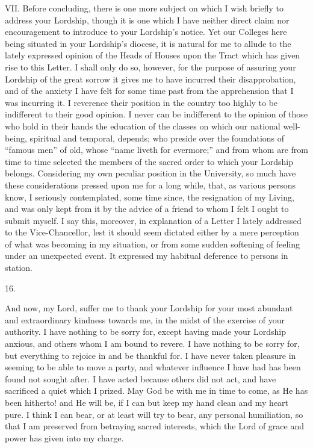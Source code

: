 VII.
Before concluding, there is one more subject on which I wish briefly
to address your Lordship, though it is one which I have neither direct
claim nor encouragement to introduce to your Lordship's notice. Yet
our Colleges here being situated in your Lordship's diocese, it is
natural for me to allude to the lately expressed opinion of the Heads
of Houses upon the Tract which has given rise to this Letter. I shall
only do so, however, for the purpose of assuring your Lordship of the
great sorrow it gives me to have incurred their disapprobation, and of
the anxiety I have felt for some time past from the apprehension that
I was incurring it. I reverence their position in the country too
highly to be indifferent to their good opinion. I never can be
indifferent to the opinion of those who hold in their hands the
education of the classes on which our national well-being, spiritual
and temporal, depends; who preside over the foundations of ``famous men''
of old, whose ``name liveth for evermore;'' and from whom are from time
to time selected the members of the sacred order to which your
Lordship belongs. Considering my own peculiar position in the
University, so much have these considerations pressed upon me for a
long while, that, as various persons know, I seriously contemplated,
some time since, the resignation of my Living, and was only kept from
it by the advice of a friend to whom I felt I ought to submit myself.
I say this, moreover, in explanation of a Letter I lately addressed to
the Vice-Chancellor, lest it should seem dictated either by a
mere perception of what was becoming in my situation, or from some
sudden softening of feeling under an unexpected event. It expressed my
habitual deference to persons in station.

16.

And now, my Lord, suffer me to thank your
Lordship for your most abundant and extraordinary kindness towards me,
in the midst of the exercise of your authority. I have nothing to be
sorry for, except having made your Lordship anxious, and others whom I
am bound to revere. I have nothing to be sorry for, but everything to
rejoice in and be thankful for. I have never taken pleasure in seeming
to be able to move a party, and whatever influence I have had has been
found not sought after. I have acted because others did not act, and
have sacrificed a quiet which I prized. May God be with me in time to
come, as He has been hitherto! and He will be, if I can but keep my
hand clean and my heart pure. I think I can bear, or at least will try
to bear, any personal humiliation, so that I am preserved from
betraying sacred interests, which the Lord of grace and power has
given into my charge.

